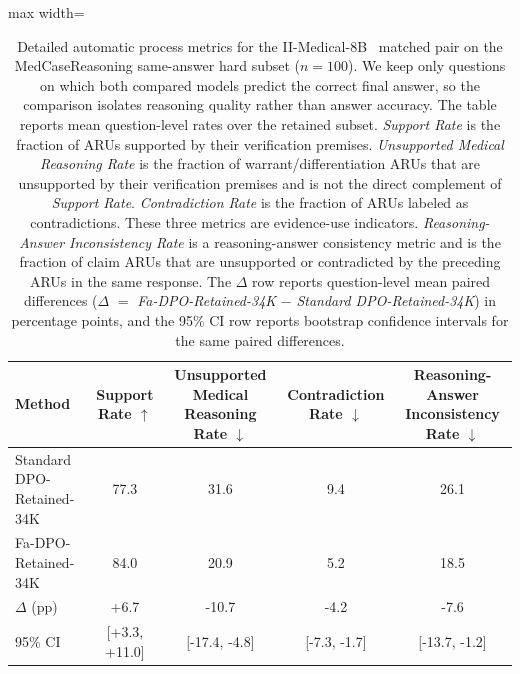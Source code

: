 \documentclass[a4paper,fleqn,doubleblind]{cas-sc}
\begin{document}
\begin{table}[htbp]
    \centering
    \footnotesize
    \setlength{\tabcolsep}{3.5pt}
    \caption[Detailed automatic process metrics for the matched pair.]{Detailed automatic process metrics for the II-Medical-8B~\cite{intelligentinternet2025iimedical8b} matched pair on the MedCaseReasoning same-answer hard subset ($n=100$). We keep only questions on which both compared models predict the correct final answer, so the comparison isolates reasoning quality rather than answer accuracy. The table reports mean question-level rates over the retained subset. \textit{Support Rate} is the fraction of ARUs supported by their verification premises. \textit{Unsupported Medical Reasoning Rate} is the fraction of warrant/differentiation ARUs that are unsupported by their verification premises and is not the direct complement of \textit{Support Rate}. \textit{Contradiction Rate} is the fraction of ARUs labeled as contradictions. These three metrics are evidence-use indicators. \textit{Reasoning-Answer Inconsistency Rate} is a reasoning-answer consistency metric and is the fraction of claim ARUs that are unsupported or contradicted by the preceding ARUs in the same response. The $\Delta$ row reports question-level mean paired differences ($\Delta$ $=$ \textit{Fa-DPO-Retained-34K} $-$ \textit{Standard DPO-Retained-34K}) in percentage points, and the 95\% CI row reports bootstrap confidence intervals for the same paired differences.}
    \label{tab:iimedical_process_detail}
    \begin{adjustbox}{max width=\columnwidth}
    \begin{tabular}{lcccc}
        \toprule
        \textbf{Method} & \textbf{Support Rate $\uparrow$} & \textbf{Unsupported Medical Reasoning Rate $\downarrow$} & \textbf{Contradiction Rate $\downarrow$} & \textbf{Reasoning-Answer Inconsistency Rate $\downarrow$} \\
        \midrule
        Standard DPO-Retained-34K & 77.3 & 31.6 & 9.4 & 26.1 \\
        Fa-DPO-Retained-34K & 84.0 & 20.9 & 5.2 & 18.5 \\
        $\Delta$ (pp) & +6.7 & -10.7 & -4.2 & -7.6 \\
        95\% CI & [+3.3, +11.0] & [-17.4, -4.8] & [-7.3, -1.7] & [-13.7, -1.2] \\
        \bottomrule
    \end{tabular}
    \end{adjustbox}
\end{table}
\end{document}
